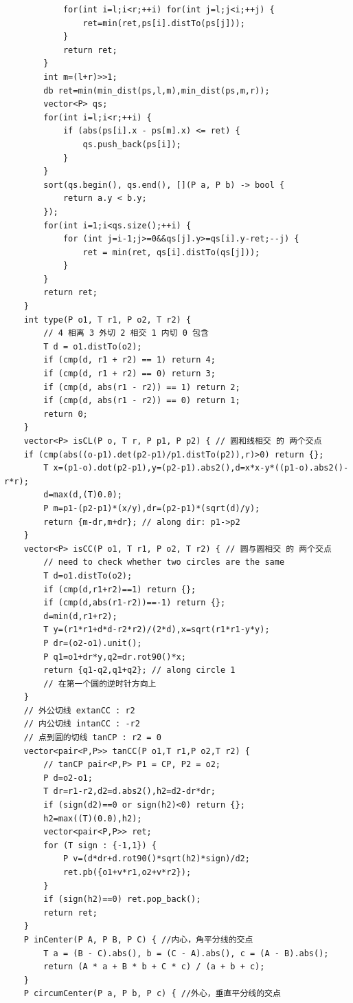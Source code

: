 \documentclass[a4paper,12pt]{article}
\begin{document}
\begin{lstlisting}
            for(int i=l;i<r;++i) for(int j=l;j<i;++j) {
                ret=min(ret,ps[i].distTo(ps[j]));
            }
            return ret;
        }
        int m=(l+r)>>1;
        db ret=min(min_dist(ps,l,m),min_dist(ps,m,r));
        vector<P> qs;
        for(int i=l;i<r;++i) {
            if (abs(ps[i].x - ps[m].x) <= ret) {
                qs.push_back(ps[i]);
            }
        }
        sort(qs.begin(), qs.end(), [](P a, P b) -> bool { 
            return a.y < b.y; 
        });
        for(int i=1;i<qs.size();++i) {
            for (int j=i-1;j>=0&&qs[j].y>=qs[i].y-ret;--j) {
                ret = min(ret, qs[i].distTo(qs[j]));
            }
        }
        return ret;
    }
    int type(P o1, T r1, P o2, T r2) {
        // 4 相离 3 外切 2 相交 1 内切 0 包含
        T d = o1.distTo(o2);
        if (cmp(d, r1 + r2) == 1) return 4;
        if (cmp(d, r1 + r2) == 0) return 3;
        if (cmp(d, abs(r1 - r2)) == 1) return 2;
        if (cmp(d, abs(r1 - r2)) == 0) return 1;
        return 0;
    }
    vector<P> isCL(P o, T r, P p1, P p2) { // 圆和线相交 的 两个交点
    if (cmp(abs((o-p1).det(p2-p1)/p1.distTo(p2)),r)>0) return {};
        T x=(p1-o).dot(p2-p1),y=(p2-p1).abs2(),d=x*x-y*((p1-o).abs2()-r*r);
        d=max(d,(T)0.0); 
        P m=p1-(p2-p1)*(x/y),dr=(p2-p1)*(sqrt(d)/y);
        return {m-dr,m+dr}; // along dir: p1->p2
    }
    vector<P> isCC(P o1, T r1, P o2, T r2) { // 圆与圆相交 的 两个交点
        // need to check whether two circles are the same
        T d=o1.distTo(o2);
        if (cmp(d,r1+r2)==1) return {};
        if (cmp(d,abs(r1-r2))==-1) return {};
        d=min(d,r1+r2);
        T y=(r1*r1+d*d-r2*r2)/(2*d),x=sqrt(r1*r1-y*y);
        P dr=(o2-o1).unit(); 
        P q1=o1+dr*y,q2=dr.rot90()*x;
        return {q1-q2,q1+q2}; // along circle 1
        // 在第一个圆的逆时针方向上
    }
    // 外公切线 extanCC : r2
    // 内公切线 intanCC : -r2
    // 点到圆的切线 tanCP : r2 = 0
    vector<pair<P,P>> tanCC(P o1,T r1,P o2,T r2) {
        // tanCP pair<P,P> P1 = CP, P2 = o2;
        P d=o2-o1;
        T dr=r1-r2,d2=d.abs2(),h2=d2-dr*dr;
        if (sign(d2)==0 or sign(h2)<0) return {};
        h2=max((T)(0.0),h2);
        vector<pair<P,P>> ret;
        for (T sign : {-1,1}) {
            P v=(d*dr+d.rot90()*sqrt(h2)*sign)/d2;
            ret.pb({o1+v*r1,o2+v*r2});
        }
        if (sign(h2)==0) ret.pop_back();
        return ret;
    }
    P inCenter(P A, P B, P C) { //内心，角平分线的交点
        T a = (B - C).abs(), b = (C - A).abs(), c = (A - B).abs();
        return (A * a + B * b + C * c) / (a + b + c);
    }
    P circumCenter(P a, P b, P c) { //外心，垂直平分线的交点

\end{lstlisting}
\end{document}
